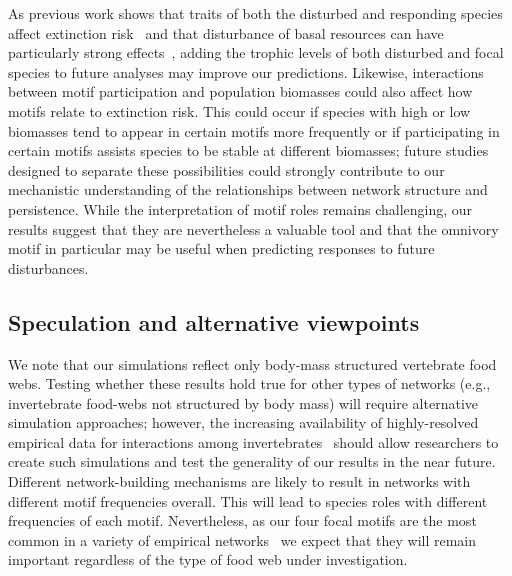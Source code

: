 \documentclass[12pt]{article}
\begin{document}
\begin{spacing}{1.0}
    
        As previous work shows that traits of both the disturbed and responding species affect extinction risk~\citep{Wootton2016} and that disturbance of basal resources can have particularly strong effects~\citep{Scherber2010}, adding the trophic levels of both disturbed and focal species to future analyses may improve our predictions.
        Likewise, interactions between motif participation and population biomasses could also affect how motifs relate to extinction risk.
        This could occur if species with high or low biomasses tend to appear in certain motifs more frequently or if participating in certain motifs assists species to be stable at different biomasses; future studies designed to separate these possibilities could strongly contribute to our mechanistic understanding of the relationships between network structure and persistence.
        While the interpretation of motif roles remains challenging, our results suggest that they are nevertheless a valuable tool and that the omnivory motif in particular may be useful when predicting responses to future disturbances.
        

    \subsection*{Speculation and alternative viewpoints}

        We note that our simulations reflect only body-mass structured vertebrate food webs.
        Testing whether these results hold true for other types of networks (e.g., invertebrate food-webs not structured by body mass) will require alternative simulation approaches; however, the increasing availability of highly-resolved empirical data for interactions among invertebrates~\citep{Waldner2012} should allow researchers to create such simulations and test the generality of our results in the near future.
        Different network-building mechanisms are likely to result in networks with different motif frequencies overall.
        This will lead to species roles with different frequencies of each motif.
        Nevertheless, as our four focal motifs are the most common in a variety of empirical networks~\citep{Stouffer2007} we expect that they will remain important regardless of the type of food web under investigation.
        

\end{spacing}
\end{document}
